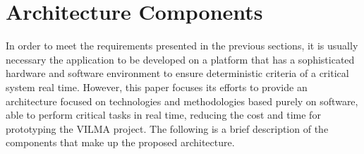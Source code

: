 \documentclass[conference]{IEEEtran}
\begin{document}

\section{Architecture Components}\label{sec:architec_components}



In order to meet the requirements presented in the previous sections, it is usually necessary the application to be developed on a platform that has a sophisticated hardware and software environment to ensure deterministic criteria of a critical system real time. However, this paper focuses its efforts to provide an architecture focused on technologies and methodologies based purely on software, able to perform critical tasks in real time, reducing the cost and time for prototyping the VILMA project. The following is a brief description of the components that make up the proposed architecture.

\end{document}
